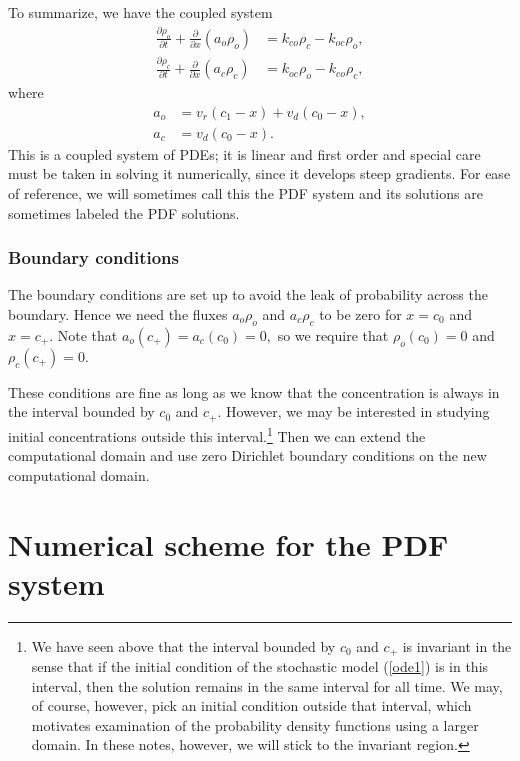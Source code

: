 To summarize, we have the coupled system
\begin{align}
\frac{\partial\rho_{o}}{\partial t}+\frac{\partial}{\partial x}\left(
a_{o}\rho_{o}\right)   &  =k_{co}\rho_{c}-k_{oc}\rho_{o}, \label{pdfsystem}\\
\frac{\partial\rho_{c}}{\partial t}+\frac{\partial}{\partial x}\left(
a_{c}\rho_{c}\right)   &  =k_{oc}\rho_{o}-k_{co}\rho_{c}, \nonumber
\end{align}
where 
\begin{align}
a_{o} &  =v_{r}(c_{1}-x)+v_{d}(c_{0}-x),\\
a_{c} &  =v_{d}(c_{0}-x).\nonumber
\end{align}
This is a coupled system of PDEs; it is linear and
first order and special care must be taken in solving it numerically, since it
develops steep gradients. For ease of reference, we will sometimes call this the PDF system
and its solutions are sometimes labeled the PDF solutions.

\subsubsection{Boundary conditions}
\label{bc}

The boundary conditions are set up to avoid the leak of probability across the
boundary. Hence we need the fluxes $a_{o}\rho_{o}$ and $a_{c}\rho_{c}$
to be zero for $x=c_{0}$ and $x=c_{+}.$ Note that $a_{o}(c_{+})=a_{c}
(c_{0})=0,$ so we require that $\rho_{o}(c_{0})=0$ and $\rho_{c}(c_{+})=0.$

These conditions are fine as long as we know that the concentration is always in the interval
bounded by $c_0$ and $c_+$. However, we may be interested in studying initial concentrations outside this interval.\footnote{We have seen above that the 
interval bounded by $c_0$ and $c_+$ is invariant in the sense that if the initial condition of the stochastic model
(\ref{ode1}) is in this interval, then the solution remains in the same interval for all time. We may, of course, however, pick an initial condition outside
that interval, which motivates examination of the probability density functions using a larger domain. In these notes, however, we will stick
to the invariant region.} Then we can 
extend the computational domain and use zero Dirichlet boundary conditions on the new computational domain.


\section{Numerical scheme for the PDF system}
\label{npdf}

